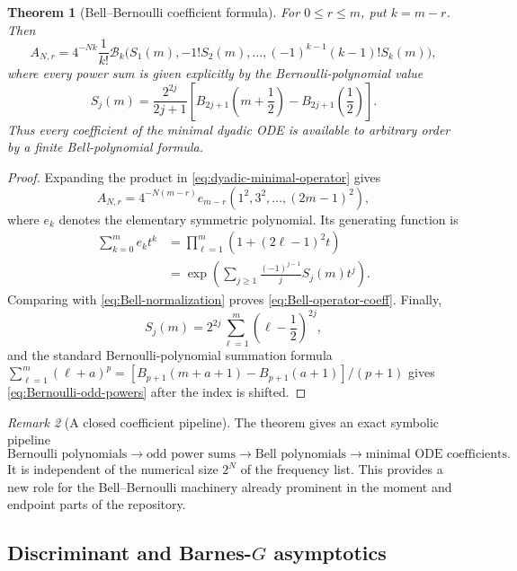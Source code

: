 \documentclass[11pt]{article}
\numberwithin{equation}{section}
\newtheorem{theorem}{Theorem}[section]
\theoremstyle{definition}
\theoremstyle{remark}
\newtheorem{remark}[theorem]{Remark}
\newcommand{\Bell}{\mathcal B}
\begin{document}
\begin{theorem}[Bell--Bernoulli coefficient formula]
\label{thm:Bell-Bernoulli-operator}
For $0\le r\le m$, put $k=m-r$.  Then
\begin{equation}
 \boxed{
 A_{N,r}=4^{-Nk}\frac{1}{k!}
 \Bell_k\bigl(S_1(m),-1!S_2(m),\ldots,
              (-1)^{k-1}(k-1)!S_k(m)\bigr),}
 \label{eq:Bell-operator-coeff}
\end{equation}
where every power sum is given explicitly by the Bernoulli-polynomial value
\begin{equation}
 \boxed{
 S_j(m)=\frac{2^{2j}}{2j+1}
 \left[B_{2j+1}\!\left(m+\frac12\right)
       -B_{2j+1}\!\left(\frac12\right)\right].}
 \label{eq:Bernoulli-odd-powers}
\end{equation}
Thus every coefficient of the minimal dyadic ODE is available to arbitrary
order by a finite Bell-polynomial formula.
\end{theorem}
\begin{proof}
Expanding the product in \eqref{eq:dyadic-minimal-operator} gives
\[
 A_{N,r}=4^{-N(m-r)}e_{m-r}(1^2,3^2,\ldots,(2m-1)^2),
\]
where $e_k$ denotes the elementary symmetric polynomial.  Its generating
function is
\begin{align*}
 \sum_{k=0}^{m}e_kt^k
 &=\prod_{\ell=1}^{m}\left(1+(2\ell-1)^2t\right)\\
 &=\exp\left(\sum_{j\ge1}
       \frac{(-1)^{j-1}}{j}S_j(m)t^j\right).
\end{align*}
Comparing with \eqref{eq:Bell-normalization} proves
\eqref{eq:Bell-operator-coeff}.  Finally,
\[
 S_j(m)=2^{2j}\sum_{\ell=1}^{m}
 \left(\ell-\frac12\right)^{2j},
\]
and the standard Bernoulli-polynomial summation formula
\(
 \sum_{\ell=1}^{m}(\ell+a)^{p}
 =[B_{p+1}(m+a+1)-B_{p+1}(a+1)]/(p+1)
\)
gives \eqref{eq:Bernoulli-odd-powers} after the index is shifted.
\end{proof}

\begin{remark}[A closed coefficient pipeline]
The theorem gives an exact symbolic pipeline
\[
 \text{Bernoulli polynomials}
 \longrightarrow \text{odd power sums}
 \longrightarrow \text{Bell polynomials}
 \longrightarrow \text{minimal ODE coefficients}.
\]
It is independent of the numerical size $2^N$ of the frequency list.  This
provides a new role for the Bell--Bernoulli machinery already prominent in the
moment and endpoint parts of the repository.
\end{remark}

\subsection{Discriminant and Barnes-\texorpdfstring{$G$}{G} asymptotics}
\end{document}
